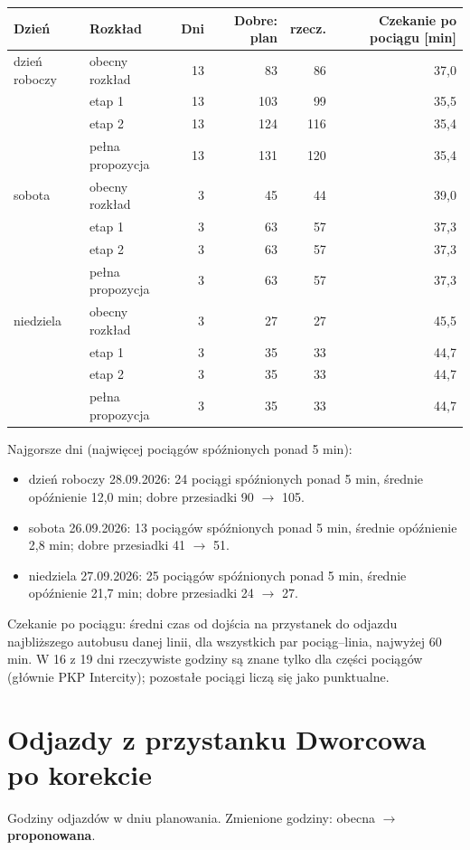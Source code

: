 \documentclass[10pt,a4paper]{article}
\newcommand{\mut}[1]{\textcolor{muted}{#1}}
\begin{document}
{\footnotesize
\begin{center}\begin{tabular}{@{}l l r r r r@{}}\toprule
Dzień & Rozkład & Dni & Dobre: plan & rzecz. & Czekanie po pociągu [min] \\ \midrule
dzień roboczy & obecny rozkład & 13 & 83 & 86 & 37,0 \\
 & etap 1 & 13 & 103 & 99 & 35,5 \\
 & etap 2 & 13 & 124 & 116 & 35,4 \\
 & pełna propozycja & 13 & 131 & 120 & 35,4 \\
sobota & obecny rozkład & 3 & 45 & 44 & 39,0 \\
 & etap 1 & 3 & 63 & 57 & 37,3 \\
 & etap 2 & 3 & 63 & 57 & 37,3 \\
 & pełna propozycja & 3 & 63 & 57 & 37,3 \\
niedziela & obecny rozkład & 3 & 27 & 27 & 45,5 \\
 & etap 1 & 3 & 35 & 33 & 44,7 \\
 & etap 2 & 3 & 35 & 33 & 44,7 \\
 & pełna propozycja & 3 & 35 & 33 & 44,7 \\
\bottomrule\end{tabular}\end{center}}
Najgorsze dni (najwięcej pociągów spóźnionych ponad 5 min):
\begin{itemize}
\item dzień roboczy 28.09.2026: 24 pociągi spóźnionych ponad 5 min, średnie opóźnienie 12,0 min; dobre przesiadki 90 $\to$ 105.
\item sobota 26.09.2026: 13 pociągów spóźnionych ponad 5 min, średnie opóźnienie 2,8 min; dobre przesiadki 41 $\to$ 51.
\item niedziela 27.09.2026: 25 pociągów spóźnionych ponad 5 min, średnie opóźnienie 21,7 min; dobre przesiadki 24 $\to$ 27.
\end{itemize}
\mut{\footnotesize Czekanie po pociągu: średni czas od dojścia na przystanek do odjazdu najbliższego autobusu danej linii, dla wszystkich par pociąg--linia, najwyżej 60 min. W 16 z 19 dni rzeczywiste godziny są znane tylko dla części pociągów (głównie PKP Intercity); pozostałe pociągi liczą się jako punktualne.}
\section{Odjazdy z przystanku Dworcowa po korekcie}
Godziny odjazdów w dniu planowania. Zmienione godziny: obecna $\to$ \textbf{proponowana}.
\end{document}
